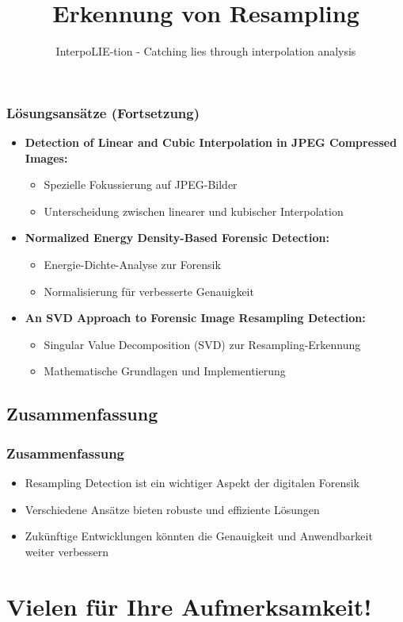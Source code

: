\documentclass[11pt,t,usepdftitle=false,aspectratio=169]{beamer}
\begin{document}
\begin{frame}
	\frametitle{Lösungsansätze (Fortsetzung)}
	\begin{itemize}
		\item \textbf{Detection of Linear and Cubic Interpolation in JPEG Compressed Images:} 
		\begin{itemize}
			\item Spezielle Fokussierung auf JPEG-Bilder
			\item Unterscheidung zwischen linearer und kubischer Interpolation
		\end{itemize}
		\item \textbf{Normalized Energy Density-Based Forensic Detection:} 
		\begin{itemize}
			\item Energie-Dichte-Analyse zur Forensik
			\item Normalisierung für verbesserte Genauigkeit
		\end{itemize}
		\item \textbf{An SVD Approach to Forensic Image Resampling Detection:} 
		\begin{itemize}
			\item Singular Value Decomposition (SVD) zur Resampling-Erkennung
			\item Mathematische Grundlagen und Implementierung
		\end{itemize}
	\end{itemize}
\end{frame}

\subsection{Zusammenfassung}

\begin{frame}
	\frametitle{Zusammenfassung}
	\begin{itemize}
		\item Resampling Detection ist ein wichtiger Aspekt der digitalen Forensik
		\item Verschiedene Ansätze bieten robuste und effiziente Lösungen
		\item Zukünftige Entwicklungen könnten die Genauigkeit und Anwendbarkeit weiter verbessern
	\end{itemize}
\end{frame}

\title[Erkennung von Resampling]{Erkennung von Resampling}
\subtitle{InterpoLIE-tion - Catching lies through interpolation analysis}
\section{Vielen für Ihre Aufmerksamkeit!}
\end{document}
